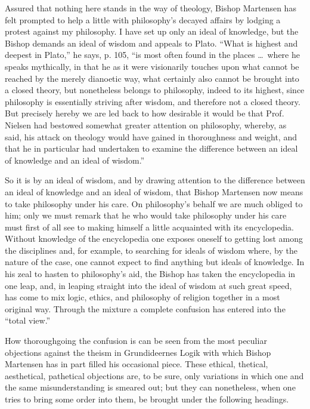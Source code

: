 \documentclass[12pt]{book}
\newcommand{\opage}[1]{\marginnote{\footnotesize\textit{[#1]}}}
\begin{document}
Assured that nothing here stands in the way of theology, Bishop Martensen has felt prompted to help a little with philosophy's decayed affairs by lodging a protest against my philosophy. I have set up only an ideal of knowledge, but the Bishop demands an ideal of wisdom and appeals to Plato. ``What is highest and deepest in Plato,'' he says, p. 105, ``is most often found in the places \dots\ where he speaks
\opage{117}\setcounter{footnote}{0}%
mythically, in that he as it were visionarily touches upon what cannot be reached by the merely dianoetic way, what certainly also cannot be brought into a closed theory, but nonetheless belongs to philosophy, indeed to its highest, since philosophy is essentially striving after wisdom, and therefore not a closed theory. But precisely hereby we are led back to how desirable it would be that Prof. Nielsen had bestowed somewhat greater attention on philosophy, whereby, as said, his attack on theology would have gained in thoroughness and weight, and that he in particular had undertaken to examine the difference between an ideal of knowledge and an ideal of wisdom.''

So it is by an ideal of wisdom, and by drawing attention to the difference between an ideal of knowledge and an ideal of wisdom, that Bishop Martensen now means to take philosophy under his care. On philosophy's behalf we are much obliged to him; only we must remark that he who would take philosophy under his care must first of all see to making himself a little acquainted with its encyclopedia. Without knowledge of the encyclopedia one exposes oneself to getting lost among the disciplines and, for example, to searching for ideals of wisdom where, by the nature of the case, one cannot expect to find anything but ideals of knowledge. In his zeal to hasten to philosophy's aid, the Bishop has taken the encyclopedia in one leap, and, in leaping straight into the ideal of wisdom at such great speed, has come to mix logic, ethics, and philosophy of religion together in a most original way. Through the mixture a complete confusion has entered into the ``total view.''

How thoroughgoing the confusion is can be seen from the most peculiar objections against the theism in Grundideernes Logik with which Bishop Martensen has in part filled his occasional piece. These ethical, thetical, aesthetical, pathetical objections are, to be sure, only variations in which one and the same misunderstanding is smeared out; but they can nonetheless,
\opage{118}\setcounter{footnote}{0}%
when one tries to bring some order into them, be brought under the following headings.
\end{document}
